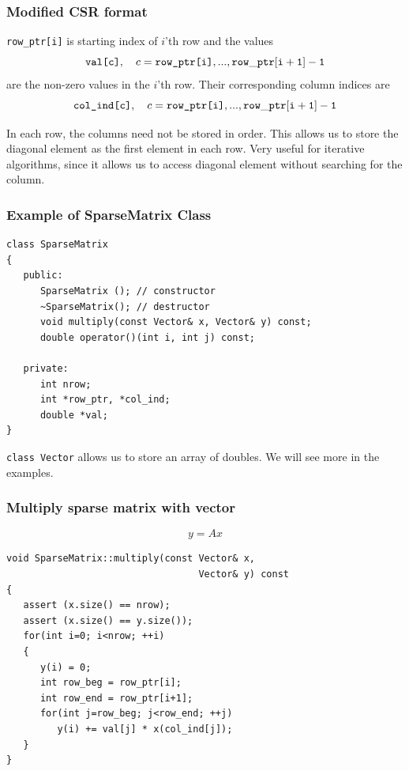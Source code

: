 \documentclass[10pt,xcolor=svgnames]{beamer}
\begin{document}
\begin{frame}
\frametitle{Modified CSR format}
{\tt row\_ptr[i]} is starting index of $i$'th row and the values
\[
\textrm{\tt val[c]}, \quad c = \textrm{\tt row\_ptr[i]}, ..., {\tt row\_ptr[i+1]-1}
\]
are the non-zero values in the $i$'th row. Their corresponding column indices are
\[
\textrm{\tt col\_ind[c]}, \quad c = \textrm{\tt row\_ptr[i]}, ..., {\tt row\_ptr[i+1]-1}
\]

\vspace{5mm}

In each row, the columns need not be stored in order. This allows us to store the diagonal element as the first element in each row. Very useful for iterative algorithms, since it allows us to access diagonal element without searching for the column.
\end{frame}
\begin{frame}[fragile]
\frametitle{Example of SparseMatrix Class}

\begin{lstlisting}
class SparseMatrix
{
   public:
      SparseMatrix (); // constructor
      ~SparseMatrix(); // destructor
      void multiply(const Vector& x, Vector& y) const;
      double operator()(int i, int j) const;
      
   private:
      int nrow;
      int *row_ptr, *col_ind;
      double *val;
}
\end{lstlisting}
{\tt class Vector} allows us to store an array of doubles. We will see more in the examples.
\end{frame}
\begin{frame}[fragile]
\frametitle{Multiply sparse matrix with vector}

\[
y = A x
\]

\begin{lstlisting}
void SparseMatrix::multiply(const Vector& x, 
                                  Vector& y) const
{
   assert (x.size() == nrow);
   assert (x.size() == y.size());
   for(int i=0; i<nrow; ++i)
   {
      y(i) = 0;
      int row_beg = row_ptr[i];
      int row_end = row_ptr[i+1];
      for(int j=row_beg; j<row_end; ++j)
         y(i) += val[j] * x(col_ind[j]);
   }
}
\end{lstlisting}

\end{frame}
\end{document}
